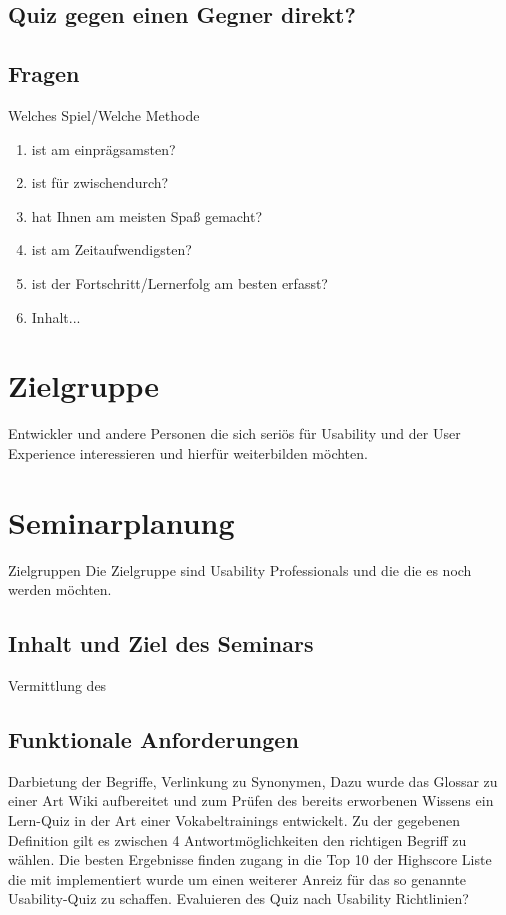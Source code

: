 \documentclass[a4paper, 12pt, twoside, BCOR=20mm, DIV=calc, abstracton, parskip=half*, toc=bibliography, toc=listof, headsepline, footsepline, headings=small, numbers=enddot]{scrreprt}
\begin{document}
	\subsection{Quiz gegen einen Gegner direkt?}
	\subsection{Fragen}
	Welches Spiel/Welche Methode
	\begin{enumerate}
		\item  ist am einprägsamsten?
		\item  ist für zwischendurch?
		\item  hat Ihnen am meisten Spaß gemacht?
		\item  ist am Zeitaufwendigsten?
		\item  ist der Fortschritt/Lernerfolg am besten erfasst?
		\item Inhalt...
	\end{enumerate}
	
	\section{Zielgruppe}
	Entwickler und andere Personen die sich seriös für Usability und der User Experience interessieren und hierfür weiterbilden möchten. 
	
	\section{Seminarplanung}
	Zielgruppen
	Die Zielgruppe sind Usability Professionals und die die es noch werden möchten. 
	\subsection{Inhalt und Ziel des Seminars}
	Vermittlung des
	\subsection{Funktionale Anforderungen}
	Darbietung der Begriffe, Verlinkung zu Synonymen, 
	Dazu wurde das Glossar zu einer Art Wiki aufbereitet und zum Prüfen des bereits erworbenen Wissens ein Lern-Quiz in der Art einer Vokabeltrainings entwickelt. Zu der gegebenen Definition gilt es zwischen 4 Antwortmöglichkeiten den richtigen Begriff zu wählen. Die besten Ergebnisse finden zugang in die Top 10 der Highscore Liste die mit implementiert wurde um einen weiterer Anreiz für das so genannte Usability-Quiz zu schaffen. 
	Evaluieren des Quiz nach Usability Richtlinien?
	
\end{document}
